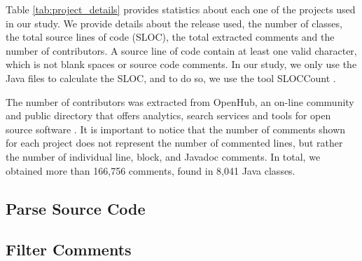 Table \ref{tab:project_details} provides statistics about each one of the projects used in our study. We provide details about the release used, the number of classes, the total source lines of code (SLOC), the total extracted comments and the number of contributors. A source line of code contain at least one valid character, which is not blank spaces or source code comments. In our study, we only use the Java files to calculate the SLOC, and to do so, we use the tool SLOCCount \cite{wheeler2004:home}. 

The number of contributors was extracted from OpenHub, an on-line community and public directory that offers analytics, search services and tools for open source software \cite{Openhub:home}. It is important to notice that the number of comments shown for each project does not represent the number of commented lines, but rather the number of individual line, block, and Javadoc comments. In total, we obtained more than 166,756 comments, found in 8,041 Java classes.
 
\subsection{Parse Source Code} %
\label{sub:parse_source_code}





\subsection{Filter Comments} %
\label{sub:filter_comments}

